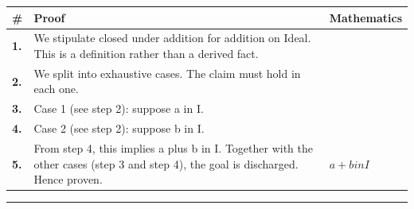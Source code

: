 \documentclass[11pt]{article}
\theoremstyle{definition}
\begin{document}
\begin{tabular}{@{} >{\raggedright\arraybackslash}p{} >{\raggedright\arraybackslash}p{} >{\raggedleft\arraybackslash}p{} @{}}
\textbf{\#} & \textbf{Proof} & \textbf{Mathematics} \\
\midrule
\textbf{1.} & We stipulate closed under addition for addition on Ideal. This is a definition rather than a derived fact. & \\[0.45em]
\textbf{2.} & We split into exhaustive cases. The claim must hold in each one. & \\[0.45em]
\textbf{3.} & Case 1 (see step 2): suppose a in I. & \\[0.45em]
\textbf{4.} & Case 2 (see step 2): suppose b in I. & \\[0.45em]
\textbf{5.} & From step 4, this implies a plus b in I. Together with the other cases (step 3 and step 4), the goal is discharged. Hence proven. & $\displaystyle a + b in I$ \\[0.45em]
\bottomrule
\end{tabular}
\label{thm:Ideal-addition-closed_under_addition}
\par\medskip\hrule
\end{document}
